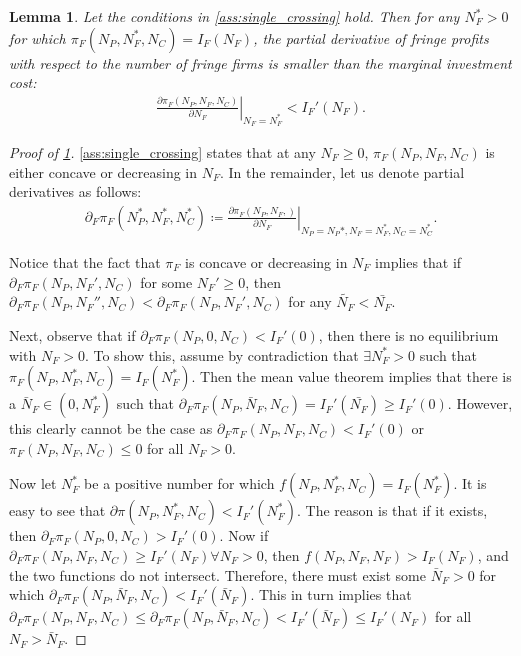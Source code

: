 \documentclass[a4paper]{article}
\newtheorem{lemma}{Lemma}
\begin{document}
\begin{lemma}
    \label{lem:slope_at_eq}
    Let the conditions in \cref{ass:single_crossing} hold. Then for any $N_F^* > 0$ for which $\pi_F(N_P, N_F^*, N_C) = I_F(N_F)$, the partial derivative of fringe profits with respect to the number of fringe firms is smaller than the marginal investment cost:
    \begin{align*}
        \left. \frac{\partial \pi_F(N_P, N_F, N_C)}{\partial N_F} \right|_{N_F = N_F^*} < I_F'(N_F).
    \end{align*}
\end{lemma}
\begin{proof}[Proof of \cref{lem:slope_at_eq}]
    \cref{ass:single_crossing} states that at any $N_F \geq 0$, $\pi_F(N_P, N_F, N_C)$ is either concave or decreasing in $N_F$.
    In the remainder, let us denote partial derivatives as follows:
    \begin{align*}
        \partial_F \pi_F(N_P^*, N_F^*, N_C^*) \coloneqq \left. \frac{\partial \pi_F(N_P, N_F,  )}{\partial N_F} \right|_{N_P = N_P*, N_F = N_F^*, N_C = N_C^*}.
    \end{align*}

    Notice that the fact that $\pi_F$ is concave or decreasing in $N_F$ implies that if $\partial_F \pi_F(N_P, N_F', N_C)$ for some $N_F' \geq 0$, then $\partial_F \pi_F(N_P, N_F'', N_C) < \partial_F \pi_F(N_P, N_F', N_C)$ for any $\tilde{N_F} < \bar{N_F}$.

    Next, observe that if $\partial_F \pi_F(N_P, 0, N_C) < I_F'(0)$, then there is no equilibrium with $N_F > 0$.
    To show this, assume by contradiction that $\exists N_F^* > 0$ such that $\pi_F(N_P, N_F^*, N_C) = I_F(N_F^*)$.
    Then the mean value theorem implies that there is a $\bar{N}_F \in (0, N_F^*)$ such that $\partial_F \pi_F(N_P, \bar{N}_F, N_C) = I_F'(\bar{N_F}) \geq I_F'(0)$.
    However, this clearly cannot be the case as $\partial_F \pi_F(N_P, N_F, N_C) < I_F'(0)$ or $\pi_F(N_P, N_F, N_C) \leq 0$ for all $N_F > 0$.

    Now let $N_F^*$ be a positive number for which $f(N_P, N_F^*, N_C) = I_F(N_F^*)$.
    It is easy to see that $\partial \pi(N_P, N_F^*, N_C) < I_F'(N_F^*)$.
    The reason is that if it exists, then $\partial_F \pi_F(N_P, 0, N_C) > I_F'(0)$.
    Now if $\partial_F \pi_F(N_P, N_F, N_C) \geq I_F'(N_F) \forall N_F > 0$, then $f(N_P, N_F, N_F) > I_F(N_F)$, and the two functions do not intersect.
    Therefore, there must exist some $\bar{N}_F > 0$ for which $\partial_F \pi_F(N_P, \bar{N}_F, N_C) < I_F'(\bar{N}_F)$.
    This in turn implies that $\partial_F \pi_F(N_P, N_F, N_C) \leq \partial_F \pi_F(N_P, \bar{N}_F, N_C) < I_F'(\bar{N}_F) \leq I_F'(N_F)$ for all $N_F > \bar{N}_F$.
\end{proof}
\end{document}
